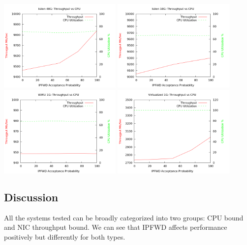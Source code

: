 \documentclass[journal]{IEEEtran}
\begin{document}
  \begin{center}
  \includegraphics[width=0.45\textwidth]{isilon40_cpu}
  \includegraphics[width=0.45\textwidth]{isilon10_cpu}
  \includegraphics[width=0.45\textwidth]{wwu1_cpu}
  \includegraphics[width=0.45\textwidth]{virtual10_cpu}
  \end{center}

  \subsection{Discussion} 

  All the systems tested can be broadly categorized into two groups: CPU bound
  and NIC throughput bound. We can see that IPFWD affects performance
  positively but differently for both types. 
\end{document}
